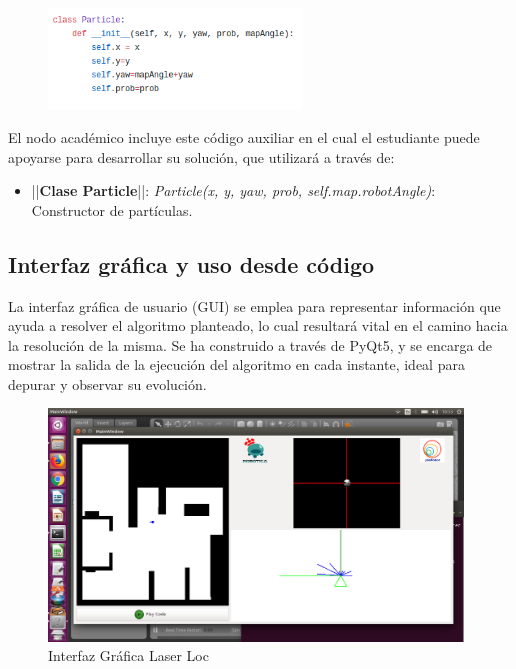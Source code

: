 \begin{figure}[H]
	\begin{center}
		\includegraphics[width=0.6\textwidth]{figures/claseparticle.png}
		\label{fig.claseparticle}
		\end{center}
\end{figure}

El nodo académico incluye este código auxiliar en el cual el estudiante puede apoyarse
para desarrollar su solución, que utilizará a través de:

\begin{itemize}
	\item ||\textbf{Clase Particle}||: \textit{Particle(x, y, yaw, prob, self.map.robotAngle)}: Constructor de partículas.
\end{itemize}

\subsection{Interfaz gráfica y uso desde código}
La interfaz gráfica de usuario (GUI) se emplea para representar información que ayuda a resolver el algoritmo planteado, lo cual resultará vital en el camino hacia la resolución de la misma. Se ha construido a través de PyQt5, y se encarga de mostrar la salida de la ejecución del algoritmo en cada instante, ideal para depurar y observar su evolución.

\begin{figure}[H]
  \begin{center}
    \includegraphics[width=0.98\textwidth]{figures/llgui.png}
		\caption{Interfaz Gráfica Laser Loc}
		\label{fig.llgui}
		\end{center}
\end{figure}

